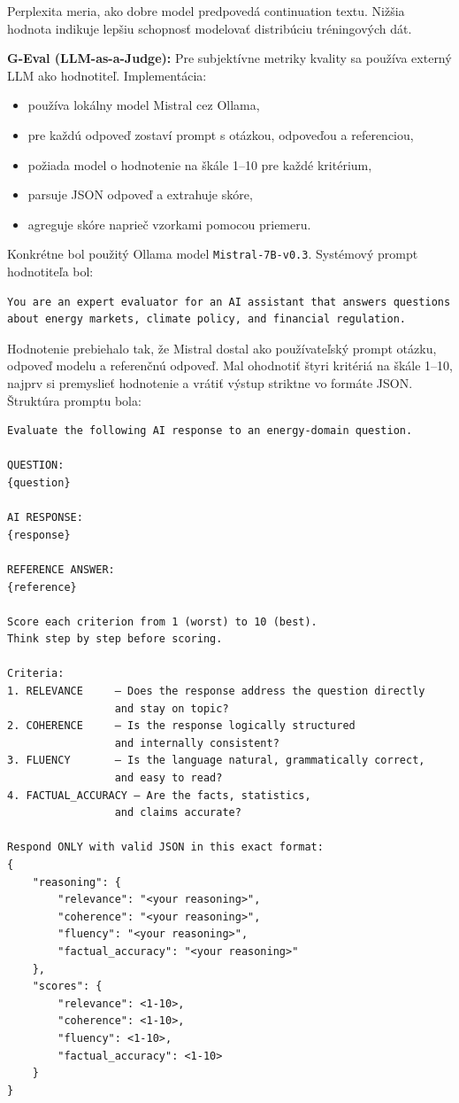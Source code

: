 Perplexita meria, ako dobre model predpovedá continuation textu. Nižšia hodnota indikuje lepšiu schopnosť modelovať distribúciu tréningových dát.
 
\textbf{G-Eval (LLM-as-a-Judge):}
Pre subjektívne metriky kvality sa používa externý LLM ako hodnotiteľ. Implementácia:
\begin{itemize}
    \item používa lokálny model Mistral cez Ollama,
    \item pre každú odpoveď zostaví prompt s otázkou, odpoveďou a referenciou,
    \item požiada model o hodnotenie na škále 1--10 pre každé kritérium,
    \item parsuje JSON odpoveď a extrahuje skóre,
    \item agreguje skóre naprieč vzorkami pomocou priemeru.
\end{itemize}

Konkrétne bol použitý Ollama model \texttt{Mistral-7B-v0.3}. Systémový prompt hodnotiteľa bol:
\begin{verbatim}
You are an expert evaluator for an AI assistant that answers questions 
about energy markets, climate policy, and financial regulation.
\end{verbatim}

Hodnotenie prebiehalo tak, že Mistral dostal ako používateľský prompt otázku, odpoveď modelu a referenčnú odpoveď. Mal ohodnotiť štyri kritériá na škále 1--10, najprv si premyslieť hodnotenie a vrátiť výstup striktne vo formáte JSON. Štruktúra promptu bola:
\begin{verbatim}
Evaluate the following AI response to an energy-domain question.

QUESTION:
{question}

AI RESPONSE:
{response}

REFERENCE ANSWER:
{reference}

Score each criterion from 1 (worst) to 10 (best).
Think step by step before scoring.

Criteria:
1. RELEVANCE     — Does the response address the question directly
                 and stay on topic?
2. COHERENCE     — Is the response logically structured
                 and internally consistent?
3. FLUENCY       — Is the language natural, grammatically correct,
                 and easy to read?
4. FACTUAL_ACCURACY — Are the facts, statistics,
                 and claims accurate?

Respond ONLY with valid JSON in this exact format:
{
    "reasoning": {
        "relevance": "<your reasoning>",
        "coherence": "<your reasoning>",
        "fluency": "<your reasoning>",
        "factual_accuracy": "<your reasoning>"
    },
    "scores": {
        "relevance": <1-10>,
        "coherence": <1-10>,
        "fluency": <1-10>,
        "factual_accuracy": <1-10>
    }
}
\end{verbatim}

